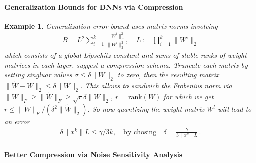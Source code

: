 \documentclass[12pt,a4paper]{article}
\newtheorem{example}{Example}
\begin{document}
\paragraph{Generalization Bounds for DNNs via Compression}

\begin{example}
Generalization error bound uses matrix norms involving 
\begin{align}
B =  L^2  \sum_{i=1}^k \frac{\| W^i\|_F^2}{\| W^i \|^2_2}, \quad L:=\prod_{i=1}^k \| W^i\|_2
\end{align}
which consists of a global Lipschitz constant and sums of stable ranks of weight matrices in each layer. \cite{arora2018stronger} suggest a compression schema. Truncate each matrix by setting singluar values  $\sigma \le \delta \| W\|_2$ to zero, then the resulting matrix $\| \tilde W - W\|_2 \le  \delta \| W\|_2$. This allows to sandwich the Frobenius norm via $\| W\|_F \ge \| \tilde W\|_F \ge \sqrt r \delta \| W\|_2$, $r=\text{rank}(W)$ for which we get $r \le \| \tilde W\|_F/(\delta^2  \| \tilde W\|_2)$.  So now quantizing the weight  matrix $W^l$ will lead to an error
\begin{align}
\delta \| x^k\| L \le \gamma/3k, \quad \text{by chosing} \quad \delta = \frac{\gamma}{3\| x^k\| L  }\,.
\end{align}
\end{example}
%
%
%

\paragraph{Better Compression via Noise Sensitivity Analysis}
\end{document}
